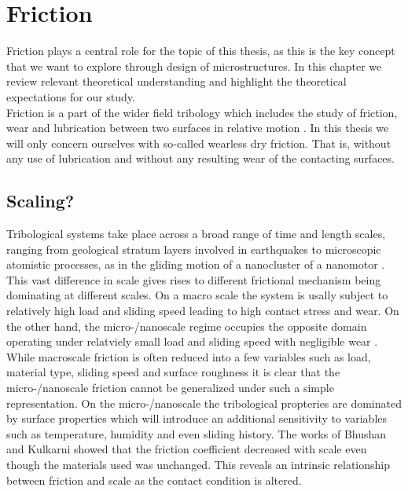 





\chapter{Friction} %
Friction plays a central role for the topic of this thesis, as this is the key concept that we want to explore through design of microstructures. In this chapter we review relevant theoretical understanding and highlight the theoretical expectations for our study.
\\

Friction is a part of the wider field tribology which includes the study of
friction, wear and lubrication between two surfaces in relative motion \cite[p.
1]{gnecco_meyer_2015}. In this thesis we will only concern ourselves with so-called wearless dry friction. That is, without any use of lubrication and without any resulting wear of the contacting surfaces. 

\section{Scaling?}
Tribological systems take place across a broad
range of time and length scales, ranging from geological stratum layers involved
in earthquakes \cite{kim_nano-scale_2009} to microscopic atomistic processes, as
in the gliding motion of a nanocluster of a nanomotor \cite{Manini_2016}. This
vast difference in scale gives rises to different frictional mechanism being
dominating at different scales. On a macro scale the system is usally subject
to relatively high load and sliding speed leading to high contact stress and
wear. On the other hand, the micro-/nanoscale regime occupies the opposite domain operating under relatviely small load and sliding speed with negligible wear \cite{kim_nano-scale_2009} \cite[p. 5]{bhushan_2013}. While macroscale friction is often reduced into a few variables such as load, material type, sliding speed and surface roughness it is clear that the micro-/nanoscale friction cannot be generalized under such a simple representation. On the micro-/nanoscale the tribological propteries are dominated by surface properties which will introduce an additional sensitivity to variables such as temperature, humidity and even sliding history. The works of Bhushan and Kulkarni \cite[(1996)]{BHUSHAN199649} showed that the friction coefficient decreased with scale even though the materials used was unchanged. This reveals an intrinsic relationship between friction and scale as the contact condition is altered.

